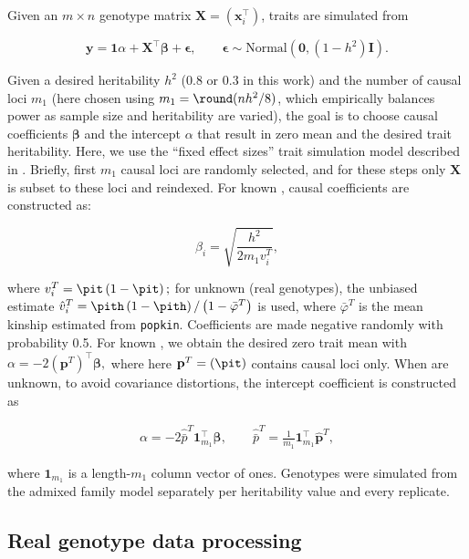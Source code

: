 \documentclass[11pt]{article}
\begin{document}
\begin{linenumbers}
Given an $m \times n$ genotype matrix $\mathbf{X} = (\mathbf{x}_i^\intercal)$, traits are simulated from
\begin{linenomath*}
$$
\mathbf{y}
=
\mathbf{1} \alpha + \mathbf{X}^\intercal \boldsymbol{\beta} + \boldsymbol{\epsilon}
, \quad\quad
\boldsymbol{\epsilon} \sim \text{Normal}(\mathbf{0}, (1 - h^2) \mathbf{I})
.
$$
\end{linenomath*}
Given a desired heritability $h^2$ (0.8 or 0.3 in this work) and the number of causal loci $m_1$ (here chosen using $m_1 = \round( n h^2 / 8 )$, which empirically balances power as sample size and heritability are varied), the goal is to choose causal coefficients $\boldsymbol{\beta}$ and the intercept $\alpha$ that result in zero mean and the desired trait heritability.
Here, we use the ``fixed effect sizes'' trait simulation model described in \citep{yao_limitations_2022}.
Briefly, first $m_1$ causal loci are randomly selected, and for these steps only $\mathbf{X}$ is subset to these loci and reindexed.
For known \pit, causal coefficients are constructed as:
\begin{linenomath*}
$$
\beta_i = \sqrt{ \frac{h^2}{ 2 m_1 v_i^T } },
$$
\end{linenomath*}
where
$
v_i^T
=
\pit \left( 1 - \pit \right)
;
$
for unknown \pit (real genotypes), the unbiased estimate
$
\hat{v}_i^T
=
\pith \left( 1 - \pith \right) / \left( 1 - \bar{\varphi}^T \right)
$
is used, where $\bar{\varphi}^T$ is the mean kinship estimated from \texttt{popkin}.
Coefficients are made negative randomly with probability 0.5.
For known \pit, we obtain the desired zero trait mean with
$
\alpha 
=
- 2 \left( \mathbf{p}^T \right)^\intercal \boldsymbol{\beta}
,
$
where here $\mathbf{p}^T = (\pit)$ contains causal loci only.
When \pit are unknown, to avoid covariance distortions, the intercept coefficient is constructed as
\begin{linenomath*}
\begin{align*}
  \alpha 
  =
  - 2 \hat{\bar{p}}^T \mathbf{1}_{m_1}^\intercal \boldsymbol{\beta}
  , \quad\quad
  \hat{\bar{p}}^T
  =
  \frac{1}{m_1} \mathbf{1}_{m_1}^\intercal \mathbf{\hat{p}}^T
  ,
\end{align*}
\end{linenomath*}
where $\mathbf{1}_{m_1}$ is a length-$m_1$ column vector of ones.
Genotypes were simulated from the admixed family model separately per heritability value and every replicate.

\subsection{Real genotype data processing}


\end{linenumbers}
\end{document}
